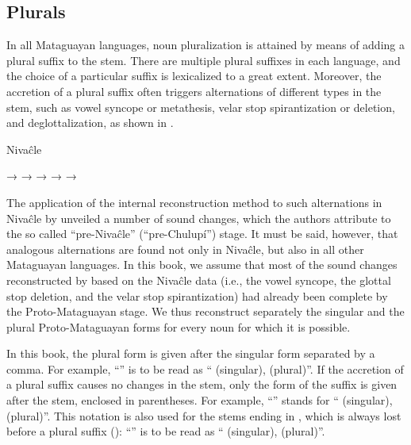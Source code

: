 \subsection{Plurals}

In all Mataguayan languages, noun pluralization is attained by means of adding a plural suffix to the stem. There are multiple plural suffixes in each language, and the choice of a particular suffix is lexicalized to a great extent. Moreover, the accretion of a plural suffix often triggers alternations of different types in the stem, such as vowel syncope or metathesis, velar stop spirantization or deletion, and deglottalization, as shown in .

\ea \label{nivplurals}
    Nivaĉle
    \begin{xlist}
        \ex {} → 
        \ex {} → 
        \ex {} → 
        \ex {} → 
        \ex {} → 
    \end{xlist}
\z
{}
    
The application of the internal reconstruction method to such alternations in Nivaĉle by \citet[5--10]{LC-VG-07} unveiled a number of sound changes, which the authors attribute to the so called “pre-Nivaĉle” (“pre-Chulupí”) stage. It must be said, however, that analogous alternations are found not only in Nivaĉle, but also in all other Mataguayan languages. In this book, we assume that most of the sound changes reconstructed by \citet{LC-VG-07} based on the Nivaĉle data (i.e., the vowel syncope, the glottal stop deletion, and the velar stop spirantization) had already been complete by the Proto-Mataguayan stage. We thus reconstruct separately the singular and the plural Proto-Mataguayan forms for every noun for which it is possible.

In this book, the plural form is given after the singular form separated by a comma. For example, “” is to be read as “ (singular),  (plural)”. If the accretion of a plural suffix causes no changes in the stem, only the form of the suffix is given after the stem, enclosed in parentheses. For example, “” stands for “ (singular),  (plural)”. This notation is also used for the stems ending in , which is always lost before a plural suffix (): “” is to be read as “ (singular),  (plural)”.

